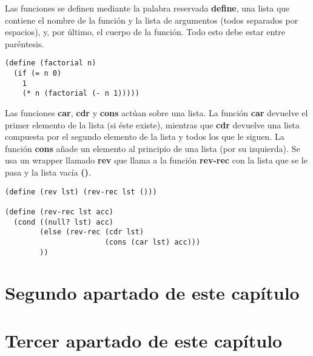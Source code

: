 Las funciones se definen mediante la palabra reservada \textbf{define}, una lista que contiene el nombre de la funci\'on y la lista de argumentos (todos separados por espacios), y, por \'ultimo, el cuerpo de la funci\'on. Todo esto debe estar entre par\'entesis.\\

\begin{minipage}{\linewidth}
\begin{small}
\begin{lstlisting}[frame=single]
(define (factorial n)
  (if (= n 0)
    1
    (* n (factorial (- n 1)))))
\end{lstlisting}
\end{small}
\end{minipage}

Las funciones \textbf{car}, \textbf{cdr} y \textbf{cons} act\'uan sobre una lista. La funci\'on \textbf{car} devuelve el primer elemento de la lista (si \'este existe), mientras que \textbf{cdr} devuelve una lista compuesta por el segundo elemento de la lista y todos los que le siguen. La funci\'on \textbf{cons} a\~nade un elemento al principio de una lista (por su izquierda). Se usa un wrapper llamado \textbf{rev} que llama a la funci\'on \textbf{rev-rec} con la lista que se le pasa y la lista vac\'ia \textbf{()}.\\

\begin{minipage}{\linewidth}
\begin{small}
\begin{lstlisting}[frame=single]
(define (rev lst) (rev-rec lst ()))

(define (rev-rec lst acc)
  (cond ((null? lst) acc)
        (else (rev-rec (cdr lst)
                       (cons (car lst) acc)))
        ))
\end{lstlisting}
\end{small}
\end{minipage}

\section{Segundo apartado de este cap\'itulo}
\label{3:sec2}

\section{Tercer apartado de este cap\'itulo}
\label{3:sec3}
